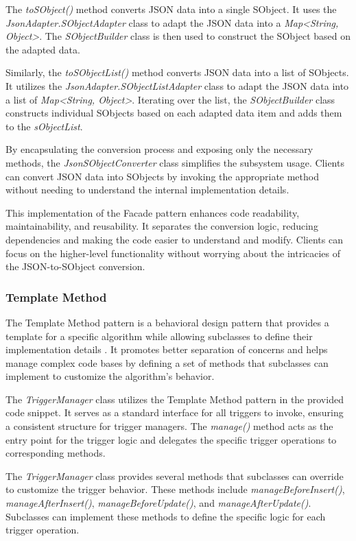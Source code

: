 \documentclass[12pt]{article}
\begin{document}
The \textit{toSObject()} method converts JSON data into a single SObject. It uses the \textit{JsonAdapter.SObjectAdapter} class to adapt the JSON data into a \textit{Map<String, Object>}. The \textit{SObjectBuilder} class is then used to construct the SObject based on the adapted data.

Similarly, the \textit{toSObjectList()} method converts JSON data into a list of SObjects. It utilizes the \textit{JsonAdapter.SObjectListAdapter} class to adapt the JSON data into a list of \textit{Map<String, Object>}. Iterating over the list, the \textit{SObjectBuilder} class constructs individual SObjects based on each adapted data item and adds them to the \textit{sObjectList}.

By encapsulating the conversion process and exposing only the necessary methods, the \textit{JsonSObjectConverter} class simplifies the subsystem usage. Clients can convert JSON data into SObjects by invoking the appropriate method without needing to understand the internal implementation details.

This implementation of the Facade pattern enhances code readability, maintainability, and reusability. It separates the conversion logic, reducing dependencies and making the code easier to understand and modify. Clients can focus on the higher-level functionality without worrying about the intricacies of the JSON-to-SObject conversion.

\subsubsection{Template Method}
The Template Method pattern is a behavioral design pattern that provides a template for a specific algorithm while allowing subclasses to define their implementation details \cite{b1}. It promotes better separation of concerns and helps manage complex code bases by defining a set of methods that subclasses can implement to customize the algorithm's behavior.

The \textit{TriggerManager} class utilizes the Template Method pattern in the provided code snippet. It serves as a standard interface for all triggers to invoke, ensuring a consistent structure for trigger managers. The \textit{manage()} method acts as the entry point for the trigger logic and delegates the specific trigger operations to corresponding methods.

The \textit{TriggerManager} class provides several methods that subclasses can override to customize the trigger behavior. These methods include \textit{manageBeforeInsert()}, \textit{manageAfterInsert()}, \textit{manageBeforeUpdate()}, and \textit{manageAfterUpdate()}. Subclasses can implement these methods to define the specific logic for each trigger operation.
\end{document}
